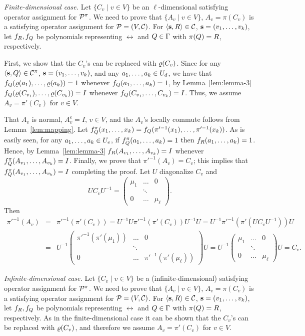 \documentclass[11pt,letter]{article}
\begin{document}
{\it Finite-dimensional case.}
Let $\{C_v\mid v\in V\}$ be an $\ell$-dimensional satisfying operator assignment for ${\mathcal P}^\pi$. We need to prove that $\{A_v\mid v\in V\}$, $A_v=\pi(C_v)$ is a satisfying operator assignment for ${\mathcal P}=(V,{\mathcal C})$. For $\langle {\bf s},R \rangle\in{\mathcal C}$, ${\bf s}=(v _1,\ldots, v _{k})$, let $f_R,f_Q$ be polynomials representing $\rel$ and $Q\in\Gamma$ with $\pi(Q)=R$, respectively. 

First, we show that the $C_v$'s can be replaced with $\varrho(C_v)$. Since for any
$\langle {\bf s},Q \rangle\in{\mathcal C}^\pi$, ${\bf s}=(v _1,\ldots, v _{k})$, and any $a _1,\ldots, a _{k}\in U_d$, we have
that $f_Q(\varrho(a_1),\ldots,\varrho(a_k))=1$ whenever $f_Q(a _1,\ldots, a _{k})=1$, by Lemma~\ref{lem:lemma-3} $f_Q(\varrho(C_{v_1}),\ldots,\varrho(C_{v_k}))=I$ whenever $f_Q(C_{v_1},\ldots, C_{v_k})=I$. Thus, we assume $A_v=\pi'(C_v)$ for $v\in V$.

That $A_v$ is normal, $A_v^e=I$, $v\in V$, and the $A_v$'s locally commute follows from Lemma~\ref{lem:mapping}. Let $f^\pi_Q(x _1,\ldots, x _{k})=f_Q(\pi'^{-1}(x_1),\ldots,\pi'^{-1}(x_k))$. As is easily seen, for any $a _1,\ldots, a _{k}\in U_e$, if $f^\pi_Q(a _1,\ldots, a _{k})=1$ then $f_R(a _1,\ldots, a _{k})=1$. Hence, by Lemma~\ref{lem:lemma-3} $f_R(A_{v_1},\ldots, A_{v_k})=I$ whenever $f^\pi_Q(A_{v_1},\ldots, A_{v_k})=I$. Finally, we prove that $\pi'^{-1}(A_v)=C_v$; this implies that $f^\pi_Q(A_{v_1},\ldots, A_{v_k})=I$ completing the proof. Let $U$ diagonalize $C_v$ and 
\[
UC_vU^{-1}=\left(\begin{array}{ccc}\mu_1&\dots&0\\ &\ddots&\\ 0&\dots&\mu_\ell\end{array}\right).
\]
Then
\begin{eqnarray*}
\pi'^{-1}(A_v) &=& \pi'^{-1}(\pi'(C_v))=U^{-1}U\pi'^{-1}(\pi'(C_v))U^{-1}U=U^{-1}\pi'^{-1}(\pi'(UC_vU^{-1}))U\\
&=& U^{-1}\left(\begin{array}{ccc}\pi'^{-1}(\pi'(\mu_1))&\dots&0\\ &\ddots&\\ 0&\dots&\pi'^{-1}(\pi'(\mu_\ell))\end{array}\right)U
= U^{-1}\left(\begin{array}{ccc}\mu_1&\dots&0\\ &\ddots&\\ 0&\dots&\mu_\ell\end{array}\right)U=C_v.
\end{eqnarray*}

{\it Infinite-dimensional case.}
Let $\{C_v\mid v\in V\}$ be a (infinite-dimensional) satisfying operator assignment for ${\mathcal P}^\pi$. We need to prove that $\{A_v\mid v\in V\}$, $A_v=\pi(C_v)$ is a satisfying operator assignment for ${\mathcal P}=(V,{\mathcal C})$. For $\langle {\bf s},R \rangle\in{\mathcal C}$, ${\bf s}=(v _1,\ldots, v _{k})$, let $f_R,f_Q$ be polynomials representing $\rel$ and $Q\in\Gamma$ with $\pi(Q)=R$, respectively. As in the finite-dimensional case it can be shown that the $C_v$'s can be replaced with $\varrho(C_v)$, and therefore we assume $A_v=\pi'(C_v)$ for $v\in V$.
\end{document}
